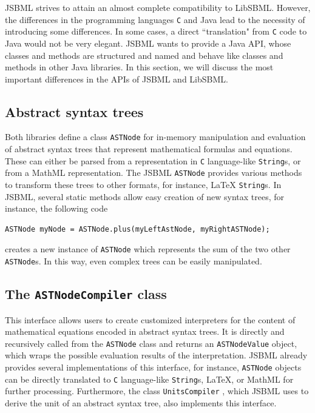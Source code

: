 \documentclass[
  BCOR12mm,
  letterpaper,
  11pt,
  headsepline,
  pointlessnumbers,
  tablecaptionabove,
  onelinecaption,
  headinclude,
  appendixprefix,
  idxtotoc,
  bibtotoc,
  twoside,
  titlepage
]{scrartcl}
\begin{document}
JSBML strives to attain an almost complete compatibility to LibSBML. However,
the differences in the programming languages \texttt{C} and Java\texttrademark{}
lead to the necessity of introducing some differences. In some cases, a direct
``translation" from \texttt{C} code to Java would not be very elegant. JSBML
wants to provide a Java API, whose classes and methods are structured and named
and behave like classes and methods in other Java libraries. In this section, we
will discuss the most important differences in the APIs of JSBML and LibSBML.


\subsection{Abstract syntax trees}

Both libraries define a class \texttt{ASTNode} for in-memory manipulation and
evaluation of abstract syntax trees that represent mathematical formulas and
equations. These can either be parsed from a representation in \texttt{C}
language-like \texttt{String}s, or from a MathML representation. The JSBML
\texttt{ASTNode} provides various methods to transform these trees to other
formats, for instance, \LaTeX{}\index{\LaTeX} \texttt{String}s. In JSBML, several static
methods allow easy creation of new syntax trees, for instance, the following
code
\begin{lstlisting}
ASTNode myNode = ASTNode.plus(myLeftAstNode, myRightASTNode);
\end{lstlisting}
creates a new instance of \texttt{ASTNode} which represents the sum of the two
other \texttt{ASTNode}s. In this way, even complex trees can be easily
manipulated.

\subsection{The \texttt{ASTNodeCompiler} class}

This interface allows users to create customized interpreters for the
content of mathematical equations encoded in abstract syntax trees. It
is directly and recursively called from the \texttt{ASTNode} class and returns
an \texttt{ASTNodeValue}
 object,
which wraps the possible evaluation results of the interpretation.
JSBML already provides several implementations of this
interface, for instance, \texttt{ASTNode} objects can be directly translated to
\texttt{C} language-like \texttt{String}s,
\LaTeX{}\index{\LaTeX}, or MathML for further processing.
Furthermore, the class \texttt{UnitsCompiler}
, which JSBML uses to derive the unit of an abstract syntax tree, also implements this interface.
\end{document}
